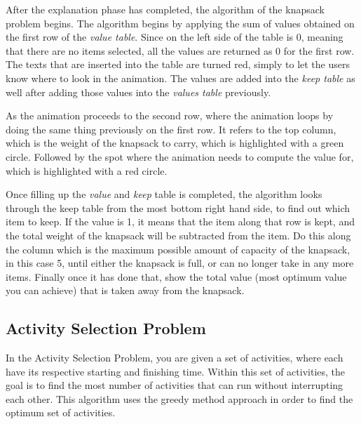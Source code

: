 After the explanation phase has completed, the algorithm of the knapsack problem begins. The algorithm begins by applying the sum of values obtained on the first row of the \textit{value table}. Since on the left side of the table is 0, meaning that there are no items selected, all the values are returned as 0 for the first row. The texts that are inserted into the table are turned red, simply to let the users know where to look in the animation. The values are added into the \textit{keep table} as well after adding those values into the \textit{values table} previously.

As the animation proceeds to the second row, where the animation loops by doing the same thing previously on the first row. It refers to the top column, which is the weight of the knapsack to carry, which is highlighted with a green circle. Followed by the spot where the animation needs to compute the value for, which is highlighted with a red circle. 

Once filling up the \textit{value} and \textit{keep} table is completed, the algorithm looks through the keep table from the most bottom right hand side, to find out which item to keep. If the value is 1, it means that the item along that row is kept, and the total weight of the knapsack will be subtracted from the item. Do this along the column which is the maximum possible amount of capacity of the knapsack, in this case 5, until either the knapsack is full, or can no longer take in any more items. Finally once it has done that, show the total value (most optimum value you can achieve) that is taken away from the knapsack.



\newpage

\subsection{Activity Selection Problem}

In the Activity Selection Problem, you are given a set of activities, where each have its respective starting and finishing time. Within this set of activities, the goal is to find the most number of activities that can run without interrupting each other. This algorithm uses the greedy method approach in order to find the optimum set of activities. 


